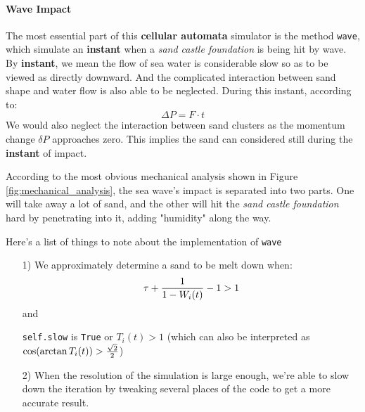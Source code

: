 \documentclass[12pt]{article}
\begin{document}
\paragraph{Wave Impact}
The most essential part of this \textbf{cellular automata} simulator is the method \texttt{wave}, which simulate an \textbf{instant} when a \textit{sand castle foundation} is being hit by wave. By \textbf{instant}, we mean the flow of sea water is considerable slow so as to be viewed as directly downward. And the complicated interaction between sand shape and water flow is also able to be neglected. During this instant, according to:
$$
    \varDelta P = {F} \cdot {t}
$$
We would also neglect the interaction between sand clusters as the momentum change $\delta P$ approaches zero. This implies the sand can considered still during the \textbf{instant} of impact.
\par
According to the most obvious mechanical analysis shown in Figure \ref{fig:mechanical_analysis}, the sea wave's impact is separated into two parts. One will take away a lot of sand, and the other will hit the \textit{sand castle foundation} hard by penetrating into it, adding "humidity" along the way.
\par
Here's a list of things to note about the implementation of \texttt{wave}
\begin{itemize}
    \item [1)]
          We approximately determine a sand to be melt down when:
          $$
              \tau + {{1}\over{1-W_i(t)}} - 1 > 1
          $$
          and\par
          \texttt{self.slow} is \texttt{True} or $T_i(t) > 1$ (which can also be interpreted as $\cos(\arctan{T_i(t)}) > {\sqrt{2} \over 2}$)
    \item [2)]
          When the resolution of the simulation is large enough, we're able to slow down the iteration by tweaking several places of the code to get a more accurate result.
\end{itemize}
\end{document}
